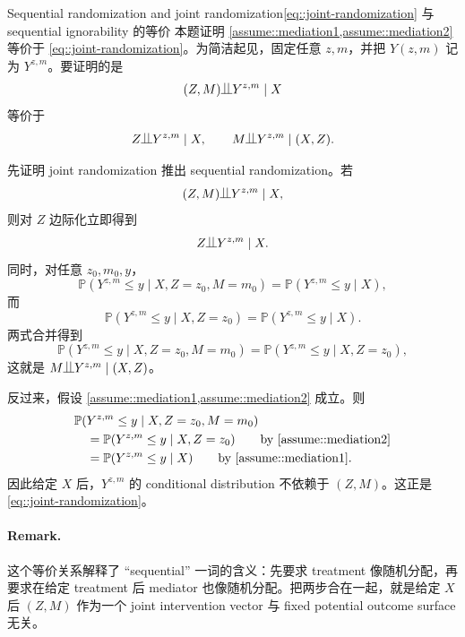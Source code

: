 \begin{exercisesolution}{Sequential randomization and joint randomization}{\cref{eq::joint-randomization} 与 sequential ignorability 的等价}
本题证明 \cref{assume::mediation1,assume::mediation2} 等价于 \cref{eq::joint-randomization}。为简洁起见，固定任意 $z,m$，并把 $Y(z,m)$ 记为 $Y^{z,m}$。要证明的是
\[
(Z,M)\ind Y^{z,m}\mid X
\]
等价于
\[
Z\ind Y^{z,m}\mid X,
\qquad
M\ind Y^{z,m}\mid (X,Z).
\]

先证明 joint randomization 推出 sequential randomization。若
\[
(Z,M)\ind Y^{z,m}\mid X,
\]
则对 $Z$ 边际化立即得到
\[
Z\ind Y^{z,m}\mid X.
\]
同时，对任意 $z_0,m_0,y$，
\[
\mathbb{P}(Y^{z,m}\leq y\mid X,Z=z_0,M=m_0)
=
\mathbb{P}(Y^{z,m}\leq y\mid X),
\]
而
\[
\mathbb{P}(Y^{z,m}\leq y\mid X,Z=z_0)
=
\mathbb{P}(Y^{z,m}\leq y\mid X).
\]
两式合并得到
\[
\mathbb{P}(Y^{z,m}\leq y\mid X,Z=z_0,M=m_0)
=
\mathbb{P}(Y^{z,m}\leq y\mid X,Z=z_0),
\]
这就是 $M\ind Y^{z,m}\mid (X,Z)$。

反过来，假设 \cref{assume::mediation1,assume::mediation2} 成立。则
\begin{align*}
&\mathbb{P}(Y^{z,m}\leq y\mid X,Z=z_0,M=m_0)\\
&\quad =
\mathbb{P}(Y^{z,m}\leq y\mid X,Z=z_0)
\qquad \text{by } \cref{assume::mediation2}\\
&\quad =
\mathbb{P}(Y^{z,m}\leq y\mid X)
\qquad \text{by } \cref{assume::mediation1}.
\end{align*}
因此给定 $X$ 后，$Y^{z,m}$ 的 conditional distribution 不依赖于 $(Z,M)$。这正是 \cref{eq::joint-randomization}。

\paragraph{Remark.}
这个等价关系解释了 ``sequential'' 一词的含义：先要求 treatment 像随机分配，再要求在给定 treatment 后 mediator 也像随机分配。把两步合在一起，就是给定 $X$ 后 $(Z,M)$ 作为一个 joint intervention vector 与 fixed potential outcome surface 无关。
\end{exercisesolution}


